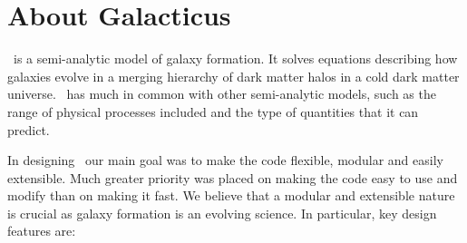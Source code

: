 \chapter{About Galacticus}

\glc\ is a semi-analytic model of galaxy formation. It solves equations describing how galaxies evolve in a merging hierarchy of dark matter halos in a cold dark matter universe. \glc\ has much in common with other semi-analytic models, such as the range of physical processes included and the type of quantities that it can predict.

In designing \glc\ our main goal was to make the code flexible, modular and easily extensible. Much greater priority was placed on making the code easy to use and modify than on making it fast. We believe that a modular and extensible nature is crucial as galaxy formation is an evolving science. In particular, key design features are:
